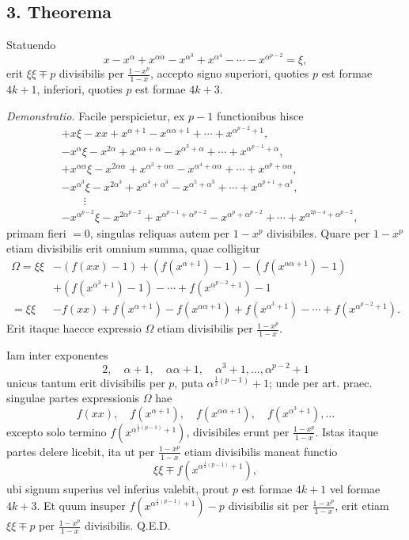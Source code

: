 \documentclass[12pt]{article}
\begin{document}
\subsection*{3. Theorema}

Statuendo
\[
x-x^\alpha+x^{\alpha\alpha}-x^{\alpha^3}+x^{\alpha^4}-\cdots-x^{\alpha^{p-2}}=\xi,
\]
erit $\xi\xi\mp p$ divisibilis per $\frac{1-x^p}{1-x}$, accepto signo superiori, quoties $p$ est formae $4k+1$, inferiori, quoties $p$ est formae $4k+3$.

\emph{Demonstratio.} Facile perspicietur, ex $p-1$ functionibus hisce
\[
\begin{aligned}
&+x\xi-xx+x^{\alpha+1}-x^{\alpha\alpha+1}+\cdots+x^{\alpha^{p-2}+1},\\
&-x^\alpha\xi-x^{2\alpha}+x^{\alpha\alpha+\alpha}-x^{\alpha^3+\alpha}+\cdots+x^{\alpha^{p-1}+\alpha},\\
&+x^{\alpha\alpha}\xi-x^{2\alpha\alpha}+x^{\alpha^3+\alpha\alpha}-x^{\alpha^4+\alpha\alpha}+\cdots+x^{\alpha^p+\alpha\alpha},\\
&-x^{\alpha^3}\xi-x^{2\alpha^3}+x^{\alpha^4+\alpha^3}-x^{\alpha^5+\alpha^3}+\cdots+x^{\alpha^{p+1}+\alpha^3},\\
&\qquad\vdots\\
&-x^{\alpha^{p-2}}\xi-x^{2\alpha^{p-2}}+x^{\alpha^{p-1}+\alpha^{p-2}}-x^{\alpha^p+\alpha^{p-2}}+\cdots+x^{\alpha^{2p-4}+\alpha^{p-2}},
\end{aligned}
\]
primam fieri $=0$, singulas reliquas autem per $1-x^p$ divisibiles. Quare per $1-x^p$ etiam divisibilis erit omnium summa, quae colligitur
\[
\begin{aligned}
\Omega=\xi\xi
&-(f(xx)-1)+(f(x^{\alpha+1})-1)-(f(x^{\alpha\alpha+1})-1)\\
&+(f(x^{\alpha^3+1})-1)-\cdots+f(x^{\alpha^{p-2}+1})-1\\
=\xi\xi
&-f(xx)+f(x^{\alpha+1})-f(x^{\alpha\alpha+1})
 +f(x^{\alpha^3+1})-\cdots+f(x^{\alpha^{p-2}+1}).
\end{aligned}
\]
Erit itaque haecce expressio $\Omega$ etiam divisibilis per $\frac{1-x^p}{1-x}$.

Iam inter exponentes
\[
2,\quad \alpha+1,\quad \alpha\alpha+1,\quad \alpha^3+1,\ldots,\alpha^{p-2}+1
\]
unicus tantum erit divisibilis per $p$, puta $\alpha^{\frac12(p-1)}+1$; unde per art. praec. singulae partes expressionis $\Omega$ hae
\[
f(xx),\quad f(x^{\alpha+1}),\quad f(x^{\alpha\alpha+1}),\quad f(x^{\alpha^3+1}),\ldots
\]
excepto solo termino $f(x^{\alpha^{\frac12(p-1)}+1})$, divisibiles erunt per $\frac{1-x^p}{1-x}$. Istas itaque partes delere licebit, ita ut per $\frac{1-x^p}{1-x}$ etiam divisibilis maneat functio
\[
\xi\xi\mp f(x^{\alpha^{\frac12(p-1)}+1}),
\]
ubi signum superius vel inferius valebit, prout $p$ est formae $4k+1$ vel formae $4k+3$. Et quum insuper $f(x^{\alpha^{\frac12(p-1)}+1})-p$ divisibilis sit per $\frac{1-x^p}{1-x}$, erit etiam $\xi\xi\mp p$ per $\frac{1-x^p}{1-x}$ divisibilis. Q.E.D.
\end{document}
